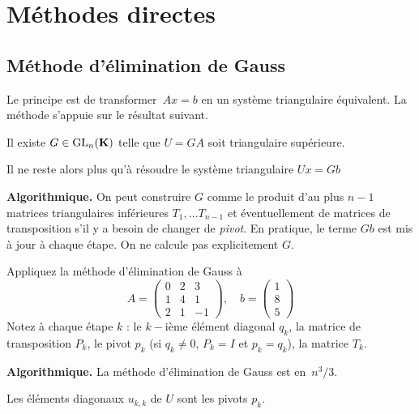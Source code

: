 \clearpage
\section{Méthodes directes}


\subsection{Méthode d'élimination de Gauss}

Le principe est de transformer~$Ax=b$ en un système
triangulaire équivalent. La méthode s'appuie sur le résultat suivant.

\begin{proposition}
Il existe $G \in\mathrm{GL}_n(\mathbf{K})$ telle que $U = GA$ soit triangulaire supérieure.
\end{proposition}
Il ne reste alors plus qu'à résoudre le système triangulaire $Ux = Gb$

{\bf Algorithmique.}
On peut construire $G$ comme le produit d'au plus $n-1$ matrices triangulaires inférieures $T_1,\dots T_{n-1}$ et éventuellement de matrices de transposition s'il y a besoin de changer de \emph{pivot}. En pratique, le terme $Gb$ est mis à jour à chaque étape. On ne calcule pas explicitement $G$.

\begin{exercice}
Appliquez la méthode d'élimination de Gauss à
\[
A = \left(\begin{array}{ccc}
0 & 2 & 3 \\
1 & 4 & 1  \\
2 & 1 & -1
\end{array}\right), \quad b = \begin{pmatrix}1 \\ 8 \\5\end{pmatrix}
\]
Notez à chaque étape $k$ : le $k-$ième élément diagonal $q_k$, la matrice de
transposition $P_k$, le pivot $p_k$ (si $q_k \neq 0$, $P_k = I$ et $p_k =
q_k$), la matrice $T_k$.
\end{exercice}

{\bf Algorithmique.}
La méthode d'élimination de Gauss est en~$\displaystyle {n^3}/{3}$.

\begin{remark}
Les éléments diagonaux $u_{k,k}$ de $U$ sont les pivots $p_k$.
\end{remark}

